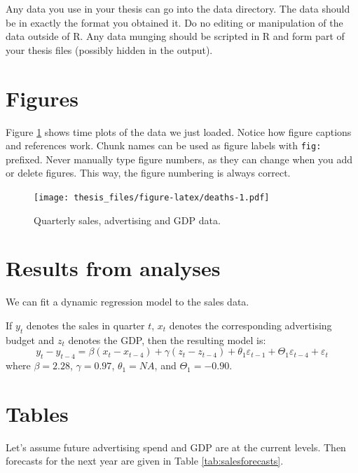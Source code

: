 \documentclass{aucklandthesis}
\begin{document}
Any data you use in your thesis can go into the data directory. The data should be in exactly the format you obtained it. Do no editing or manipulation of the data outside of R. Any data munging should be scripted in R and form part of your thesis files (possibly hidden in the output).

\hypertarget{figures}{%
\section{Figures}\label{figures}}

Figure \ref{fig:deaths} shows time plots of the data we just loaded. Notice how figure captions and references work. Chunk names can be used as figure labels with \texttt{fig:} prefixed. Never manually type figure numbers, as they can change when you add or delete figures. This way, the figure numbering is always correct.

\begin{figure}
\centering
\texttt{[image: thesis\_files/figure-latex/deaths-1.pdf]}
\caption{\label{fig:deaths}Quarterly sales, advertising and GDP data.}
\end{figure}

\hypertarget{results-from-analyses}{%
\section{Results from analyses}\label{results-from-analyses}}

We can fit a dynamic regression model to the sales data.

If \(y_t\) denotes the sales in quarter \(t\), \(x_t\) denotes the corresponding advertising budget and \(z_t\) denotes the GDP, then the resulting model is:
\begin{equation}
  y_t - y_{t-4} = \beta (x_t-x_{t-4}) + \gamma (z_t-z_{t-4}) + \theta_1 \varepsilon_{t-1} + \Theta_1 \varepsilon_{t-4} + \varepsilon_t
\end{equation}
where
\(\beta = 2.28\),
\(\gamma = 0.97\),
\(\theta_1 = NA\),
and
\(\Theta_1 = -0.90\).

\hypertarget{tables}{%
\section{Tables}\label{tables}}

Let's assume future advertising spend and GDP are at the current levels. Then forecasts for the next year are given in Table \ref{tab:salesforecasts}.
\end{document}
